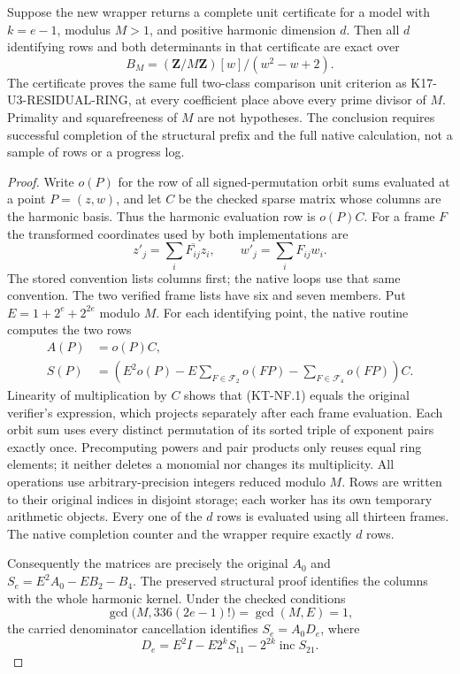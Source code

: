\begin{proposition}
Suppose the new wrapper returns a complete unit certificate for a
model with $k=e-1$, modulus $M>1$, and positive harmonic dimension
$d$.  Then all $d$ identifying rows and both determinants in that
certificate are exact over
\[
 B_M=(\mathbf Z/M\mathbf Z)[w]/(w^2-w+2).
\]
The certificate proves the same full two-class comparison unit
criterion as K17-U3-RESIDUAL-RING, at every coefficient place above
every prime divisor of $M$.  Primality and squarefreeness of $M$
are not hypotheses.  The conclusion requires successful completion
of the structural prefix and the full native calculation, not a
sample of rows or a progress log.
\end{proposition}
\begin{proof}
Write $o(P)$ for the row of all signed-permutation orbit sums
evaluated at a point $P=(z,w)$, and let $C$ be the checked sparse
matrix whose columns are the harmonic basis.  Thus the harmonic
evaluation row is $o(P)C$.  For a frame $F$ the transformed coordinates
used by both implementations are
\[
 z'_j=\sum_i\overline{F_{ij}}z_i,
 \qquad w'_j=\sum_iF_{ij}w_i.
\]
The stored convention lists columns first; the native loops use
that same convention.  The two verified frame lists have six and
seven members.  Put $E=1+2^e+2^{2e}$ modulo $M$.  For each identifying
point, the native routine computes the two rows
\[
 \begin{split}
 A(P)&=o(P)C,\\
 S(P)&=\left(E^2o(P)-E\sum_{F\in\mathcal F_2}o(FP)
                         -\sum_{F\in\mathcal F_4}o(FP)\right)C.
 \end{split}                                                    \tag{KT-NF.1}
\]
Linearity of multiplication by $C$ shows that (KT-NF.1) equals
the original verifier's expression, which projects separately
after each frame evaluation.  Each orbit sum uses every distinct
permutation of its sorted triple of exponent pairs exactly once.
Precomputing powers and pair products only reuses equal ring
elements; it neither deletes a monomial nor changes its multiplicity.
All operations use arbitrary-precision integers reduced modulo $M$.
Rows are written to their original indices in disjoint storage;
each worker has its own temporary arithmetic objects.  Every one
of the $d$ rows is evaluated using all thirteen frames.  The native
completion counter and the wrapper require exactly $d$ rows.

Consequently the matrices are precisely the original $A_0$ and
$S_e=E^2A_0-EB_2-B_4$.  The preserved structural proof identifies
the columns with the whole harmonic kernel.  Under the checked
conditions
\[
 \gcd\bigl(M,336(2e-1)!\bigr)=\gcd(M,E)=1,
\]
the carried denominator cancellation identifies $S_e=A_0D_e$,
where
\[
 D_e=E^2I-E2^kS_{11}-2^{2k}\operatorname{inc}S_{21}.
\]


\end{proof}
